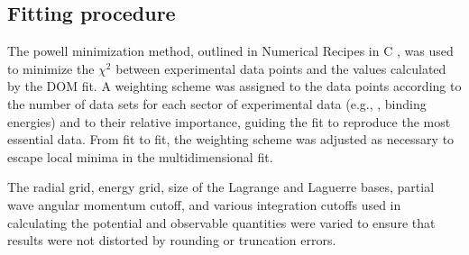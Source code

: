

\subsection{Fitting procedure}
The powell minimization method, outlined in Numerical Recipes in C \cite{NumericalRecipes},
was used to minimize the $\chi^{2}$ between experimental data points and the
values calculated by the DOM fit. A weighting scheme was assigned to the data points
according to the number of data sets for each sector of experimental data (e.g., \el,
binding energies) and to their relative importance, guiding the fit to reproduce
the most essential data. From fit to fit, the weighting scheme was adjusted
as necessary to escape local minima in the multidimensional fit.

The radial grid, energy grid, size of the Lagrange and Laguerre bases,
partial wave angular momentum cutoff,
and various integration cutoffs used in calculating the potential and
observable quantities were varied to ensure that results were not distorted by rounding or
truncation errors.
\afterpage{\clearpage}
